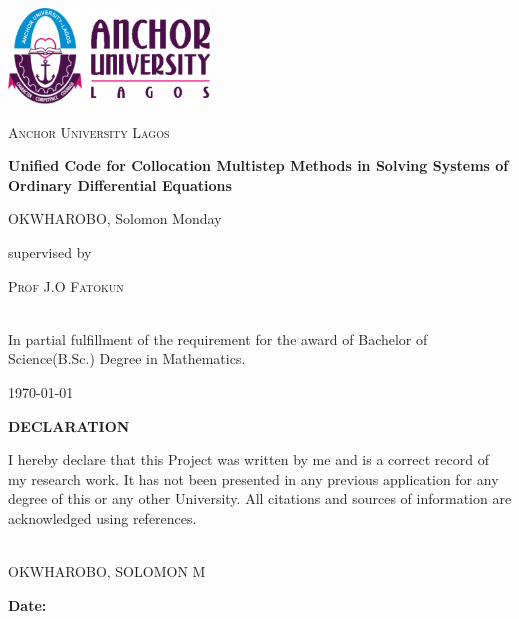 \documentclass[a4paper, twoside]{report} %
\begin{document}
	\fontsize{13}{15}\selectfont
	\begin{titlepage}
		\centering
		\vspace*{1cm}
		\includegraphics[width=0.4\textwidth]{aul_logo.png}\par
		\vspace{1.5cm}
		{\scshape\LARGE Anchor University Lagos \par}
		\vspace{1cm}
		\vspace{1.5cm}
		{\huge\bfseries Unified Code for Collocation Multistep Methods in Solving Systems of Ordinary Differential Equations\par}
		\vspace{2cm}
		{\Large OKWHAROBO, Solomon Monday\par}
		\vfill
		supervised by\par
		\textsc{Prof J.O Fatokun}


		 \\
		In partial fulfillment of the requirement for the award of Bachelor of Science(B.Sc.) Degree in Mathematics.


		\vfill

		{\large \today\par}
	\end{titlepage}


	\begin{titlepage}
		\begin{center}
			\textbf{\huge DECLARATION}
		\end{center}

		\vspace{1cm}

		\noindent
		I hereby declare that this Project was written by me and is a correct record of my research work. It has not been presented in any previous application for any degree of this or any other University. All citations and sources of information are acknowledged using references.

		\vfill

		\noindent
		\makebox[3in]{\hrulefill} \\
		OKWHAROBO, SOLOMON M \\

		\vspace{1cm}

		\noindent
		\textbf{Date:} \makebox[2in]{\hrulefill}
	\end{titlepage}
\end{document}
